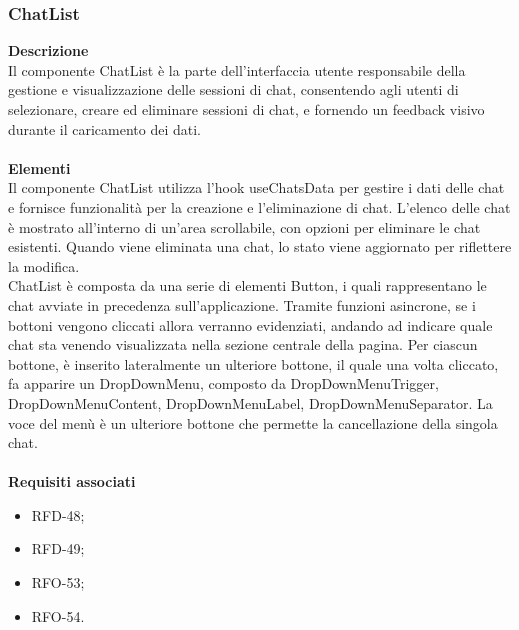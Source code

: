 \subsubsection{ChatList}
\textbf{Descrizione}\\
Il componente ChatList è la parte dell'interfaccia utente responsabile della gestione e visualizzazione delle sessioni di chat, consentendo agli utenti di selezionare, creare ed eliminare sessioni di chat, e fornendo un feedback visivo durante il caricamento dei dati.\\ \\
\textbf{Elementi}\\
Il componente ChatList utilizza l'hook useChatsData per gestire i dati delle chat e fornisce funzionalità per la creazione e l'eliminazione di chat. L'elenco delle chat è mostrato all'interno di un'area scrollabile, con opzioni per eliminare le chat esistenti. Quando viene eliminata una chat, lo stato viene aggiornato per riflettere la modifica.\\
ChatList è composta da una serie di elementi Button, i quali rappresentano  le chat avviate in precedenza sull'applicazione. Tramite funzioni asincrone, se i bottoni vengono cliccati allora verranno evidenziati, andando ad indicare quale chat sta venendo visualizzata nella sezione centrale della pagina. Per ciascun bottone, è inserito lateralmente un ulteriore bottone, il quale una volta cliccato, fa apparire un DropDownMenu, composto da DropDownMenuTrigger, DropDownMenuContent, DropDownMenuLabel, DropDownMenuSeparator. La voce del menù è un ulteriore bottone che permette la cancellazione della singola chat.  \\ \\
\textbf{Requisiti associati}
\begin{itemize}[itemsep=-4pt]
    \item RFD-48;
    \item RFD-49;
    \item RFO-53;
    \item RFO-54.
\end{itemize}

